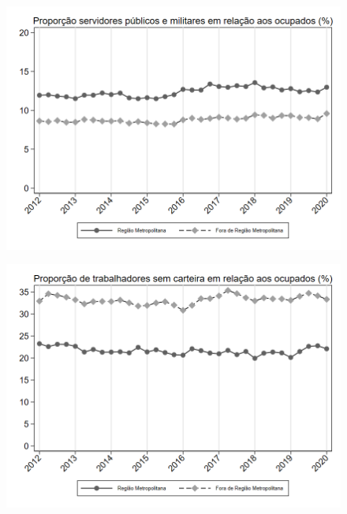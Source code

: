 \begin{frame}[label=_composicao_demografica_regiao_metro_prop_militar]{}
\textit{\hyperlink{_composicao_demografica_regiao_metro}{}}
\begin{figure}
  \centering
  \includegraphics[width=1.0\linewidth]{../../analysis/output/composicao_demografica/area_geografica/_composicao_demografica_regiao_metro_prop_militar.png}
  \caption{}
  \label{fig:_composicao_demografica_regiao_metro_prop_militar}
\end{figure}
\end{frame}


\begin{frame}[label=_composicao_demografica_regiao_metro_prop_empregadoSC]{}
\textit{\hyperlink{_composicao_demografica_regiao_metro}{}}
\begin{figure}
  \centering
  \includegraphics[width=1.0\linewidth]{../../analysis/output/composicao_demografica/area_geografica/_composicao_demografica_regiao_metro_prop_empregadoSC.png}
  \caption{}
  \label{fig:_composicao_demografica_regiao_metro_prop_empregadoSC}
\end{figure}
\end{frame}

